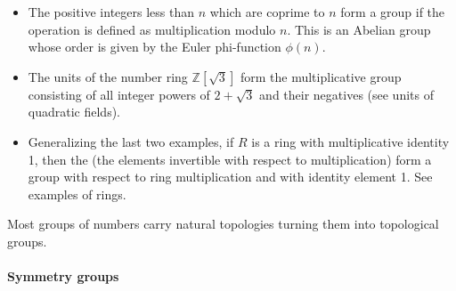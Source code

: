 \documentclass[12pt]{article}
\begin{document}
\begin{itemize}
\item The positive integers less than $n$ which are
coprime to $n$ form a group if the operation is defined as
multiplication modulo $n$. This is an Abelian group whose order is given by the
Euler phi-function $\phi(n)$.

\item The units of the number ring $\mathbb{Z}[\sqrt{3}]$ form the multiplicative group consisting of all integer powers of $2+\sqrt{3}$ and their negatives (see units of quadratic fields).

\item Generalizing the last two examples, if $R$ is a ring with multiplicative identity 1, then the  (the elements invertible with respect to multiplication) form a group with respect to ring multiplication and with identity element 1. See examples of rings.

\end{itemize}

Most groups of numbers carry natural topologies turning them into
topological groups.

\paragraph{Symmetry groups}
\end{document}
